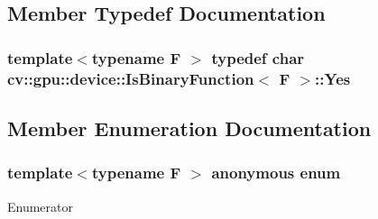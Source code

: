 \subsection{Member Typedef Documentation}
\hypertarget{structcv_1_1gpu_1_1device_1_1IsBinaryFunction_a791b19dc5bfef876ebe0f3b2c966f597}{
\subsubsection[{Yes}]{\setlength{\rightskip}{0pt plus 5cm}template$<$typename F $>$ typedef char {\bf cv\-::gpu\-::device\-::\-Is\-Binary\-Function}$<$ {\bf F} $>$\-::{\bf Yes}}}\label{structcv_1_1gpu_1_1device_1_1IsBinaryFunction_a791b19dc5bfef876ebe0f3b2c966f597}


\subsection{Member Enumeration Documentation}
\hypertarget{structcv_1_1gpu_1_1device_1_1IsBinaryFunction_afa3e026392b656ee527d59a445d324ed}{\subsubsection[{anonymous enum}]{\setlength{\rightskip}{0pt plus 5cm}template$<$typename F $>$ anonymous enum}}\label{structcv_1_1gpu_1_1device_1_1IsBinaryFunction_afa3e026392b656ee527d59a445d324ed}
\begin{Desc}
\item[Enumerator]\par
\begin{description}
\item[{\em 
\hypertarget{structcv_1_1gpu_1_1device_1_1IsBinaryFunction_afa3e026392b656ee527d59a445d324eda27b61fdbe1dbfc4cea1e5305f8044e7b}{value}\label{structcv_1_1gpu_1_1device_1_1IsBinaryFunction_afa3e026392b656ee527d59a445d324eda27b61fdbe1dbfc4cea1e5305f8044e7b}
}]\end{description}
\end{Desc}


